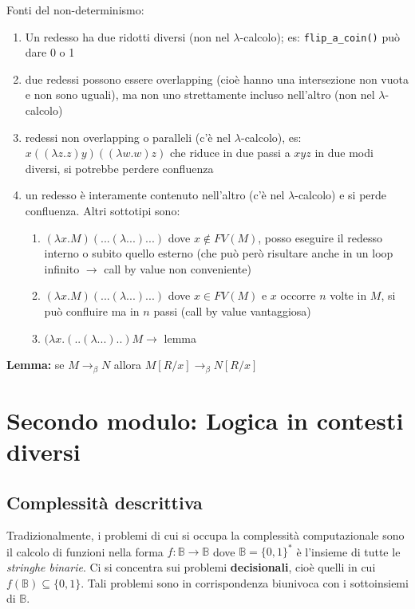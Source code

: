 \documentclass{article}
\begin{document}
Fonti del non-determinismo:
\begin{enumerate}
    \item Un redesso ha due ridotti diversi (non nel $\lambda$-calcolo); es: \verb|flip_a_coin()| può dare 0 o 1
    \item due redessi possono essere overlapping (cioè hanno una intersezione non vuota e non sono uguali), ma non uno strettamente incluso nell'altro (non nel $\lambda$-calcolo)
    \item redessi non overlapping o paralleli (c'è nel $\lambda$-calcolo), es: $x((\lambda z.z)y)((\lambda w.w)z)$ che riduce in due passi a $xyz$ in due modi diversi, si potrebbe perdere confluenza
    \item un redesso è interamente contenuto nell'altro (c'è nel $\lambda$-calcolo) e si perde confluenza. Altri sottotipi sono:
    \begin{enumerate}
        \item $(\lambda x.M)(...(\lambda...)...)$ dove $x\not\in FV(M)$, posso eseguire il redesso interno o subito quello esterno (che può però risultare anche in un loop infinito $\to$ call by value non conveniente)
        \item $(\lambda x.M)(...(\lambda...)...)$ dove $x\in FV(M)$ e $x$ occorre $n$ volte in $M$, si può confluire ma in $n$ passi (call by value vantaggiosa)
        \item $(\lambda x.(..(\lambda...)..)M\to$ lemma
    \end{enumerate}
\end{enumerate}

\bigskip

\textbf{Lemma:} se $M\to_\beta N$ allora $M[R/x]\to_\beta N[R/x]$

\newpage
\section{Secondo modulo: Logica in contesti diversi}

\subsection{Complessità descrittiva}
Tradizionalmente, i problemi di cui si occupa la complessità computazionale sono il calcolo di funzioni nella forma $f : \mathbb{B} \to \mathbb{B}$ dove $\mathbb{B} = \{0, 1\}^*$ è l’insieme di tutte le \textit{stringhe binarie}. Ci si concentra sui problemi \textbf{decisionali}, cioè quelli in cui $f(\mathbb{B}) \subseteq\{0,1\}$. Tali problemi sono in corrispondenza biunivoca con i sottoinsiemi di $\mathbb{B}$.
\end{document}
